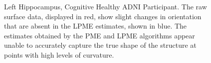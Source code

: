 \documentclass[11pt,reqno]{article}
\theoremstyle{definition}
\begin{document}
\begin{figure}%
  \centering
  \hfill
  \hfill

  \caption{Left Hippocampus, Cognitive Healthy ADNI Participant. The raw surface data, displayed in red, show slight changes in orientation that are absent in the LPME estimates, shown in blue. The estimates obtained by the PME and LPME algorithms appear unable to accurately capture the true shape of the structure at points with high levels of curvature.}
  \label{fig:adni_result}
\end{figure}

\begin{figure}%
  \centering

\end{figure}
\end{document}
